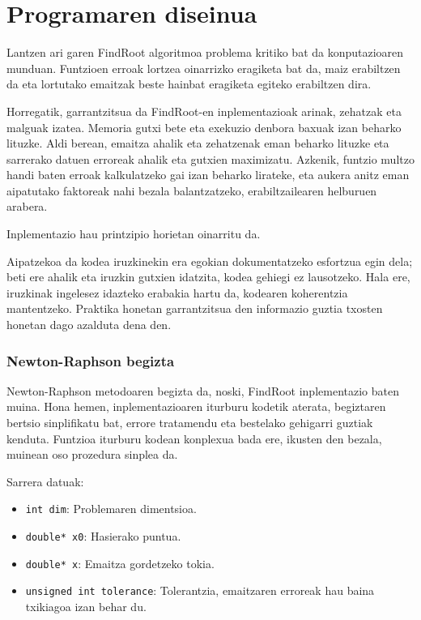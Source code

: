 \documentclass[10pt,a4paper,basque]{article}
\begin{document}
\section{Programaren diseinua}

Lantzen ari garen FindRoot algoritmoa problema kritiko bat da konputazioaren munduan. Funtzioen erroak lortzea oinarrizko eragiketa bat da, maiz erabiltzen da eta lortutako emaitzak beste hainbat eragiketa egiteko erabiltzen dira.

Horregatik, garrantzitsua da FindRoot-en inplementazioak arinak, zehatzak eta malguak izatea. Memoria gutxi bete eta exekuzio denbora baxuak izan beharko lituzke. Aldi berean, emaitza ahalik eta zehatzenak eman beharko lituzke eta sarrerako datuen erroreak ahalik eta gutxien maximizatu. Azkenik, funtzio multzo handi baten erroak kalkulatzeko gai izan beharko lirateke, eta aukera anitz eman aipatutako faktoreak nahi bezala balantzatzeko, erabiltzailearen helburuen arabera.

Inplementazio hau printzipio horietan oinarritu da.

Aipatzekoa da kodea iruzkinekin era egokian dokumentatzeko esfortzua egin dela; beti ere ahalik eta iruzkin gutxien idatzita, kodea gehiegi ez lausotzeko. Hala ere, iruzkinak ingelesez idazteko erabakia hartu da, kodearen koherentzia mantentzeko. Praktika honetan garrantzitsua den informazio guztia txosten honetan dago azalduta dena den.

\subsubsection{Newton-Raphson begizta}

Newton-Raphson  metodoaren begizta da, noski, FindRoot inplementazio baten muina. Hona hemen, inplementazioaren iturburu kodetik aterata, begiztaren bertsio sinplifikatu bat, errore tratamendu eta bestelako gehigarri guztiak kenduta. Funtzioa iturburu kodean konplexua bada ere, ikusten den bezala, muinean oso prozedura sinplea da.

Sarrera datuak:
\begin{itemize}
\item \verb|int dim|: Problemaren dimentsioa.
\item \verb|double* x0|: Hasierako puntua.
\item \verb|double* x|: Emaitza gordetzeko tokia.
\item \verb|unsigned int tolerance|: Tolerantzia, emaitzaren erroreak hau baina txikiagoa izan behar du.
\end{itemize}
\end{document}
